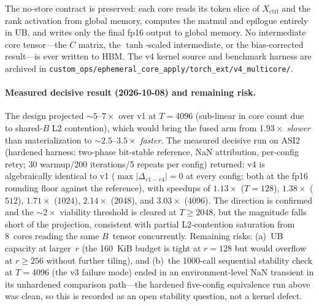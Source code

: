 The no-store contract is preserved: each core reads its token slice of
$X_{\mathrm{ctrl}}$ and the rank activation from global memory, computes the
matmul and epilogue entirely in UB, and writes only the final fp16 output
to global memory.  No intermediate core tensor---the $C$ matrix, the
$\tanh$-scaled intermediate, or the bias-corrected result---is ever written
to HBM.  The v4 kernel source and benchmark harness are archived in
\texttt{custom\_ops/ephemeral\_core\_apply/torch\_ext/v4\_multicore/}.

\paragraph{Measured decisive result (2026-10-08) and remaining risk.}
The design projected ${\sim}5$--$7\times$ over v1 at $T{=}4096$
(sub-linear in core count due to shared-$B$ L2 contention), which would
bring the fused arm from $1.93\times$ \emph{slower} than materialization
to ${\sim}2.5$--$3.5\times$ \emph{faster}.  The measured decisive run on
ASI2 (hardened harness: two-phase bit-stable reference, NaN attribution,
per-config retry; 30 warmup/200 iterations/5 repeats per config) returned:
v4 is algebraically identical to v1 ($\max|\Delta_{v1-v4}|=0$ at every
config; both at the fp16 rounding floor against the reference), with
speedups of $1.13\times$ ($T{=}128$), $1.38\times$ ($512$), $1.71\times$
($1024$), $2.14\times$ ($2048$), and $3.03\times$ ($4096$).  The
direction is confirmed and the ${\sim}2\times$ viability threshold is
cleared at $T\ge2048$, but the magnitude falls short of the projection,
consistent with partial L2-contention saturation from 8~cores reading the
same $B$~tensor concurrently.  Remaining risks: (a)~UB capacity at
larger~$r$ (the 160~KiB budget is tight at $r=128$ but would overflow at
$r\ge 256$ without further tiling), and (b)~the 1000-call sequential
stability check at $T{=}4096$ (the v3 failure mode) ended in an
environment-level NaN transient in its unhardened comparison path---the
hardened five-config equivalence run above was clean, so this is
recorded as an open stability question, not a kernel defect.

